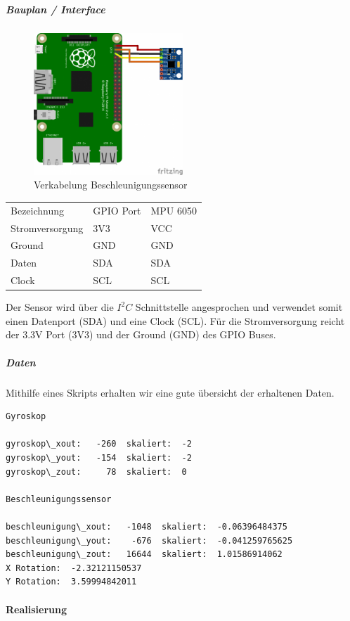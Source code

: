 \documentclass[../../main.tex]{subfiles}
\begin{document}
\subparagraph{Bauplan / Interface}
\begin{figure}[H] \centering
  \includegraphics[width=0.5\textwidth, angle=90]{Verkabelung_BeschlSensor}
  \caption{Verkabelung Beschleunigungssensor}
  \label{fig:Beschleunigungssensor}
\end{figure}

\begin{table}[] \centering
\begin{tabular}{lll}
Bezeichnung     & GPIO Port & MPU 6050 \\
Stromversorgung & 3V3      & VCC      \\
Ground          & GND      & GND      \\
Daten          & SDA      & SDA      \\
Clock          & SCL      & SCL
\end{tabular}
\end{table}

Der Sensor wird über die $I^2C$ Schnittstelle angesprochen und verwendet somit einen Datenport (SDA) und eine Clock (SCL). Für die Stromversorgung reicht der 3.3V Port (3V3) und der Ground (GND) des GPIO Buses.

\subparagraph{Daten}
Mithilfe eines Skripts erhalten wir eine gute übersicht der erhaltenen Daten.

\begin{lstlisting}
Gyroskop

gyroskop\_xout:   -260  skaliert:  -2
gyroskop\_yout:   -154  skaliert:  -2
gyroskop\_zout:     78  skaliert:  0

Beschleunigungssensor

beschleunigung\_xout:   -1048  skaliert:  -0.06396484375
beschleunigung\_yout:    -676  skaliert:  -0.041259765625
beschleunigung\_zout:   16644  skaliert:  1.01586914062
X Rotation:  -2.32121150537
Y Rotation:  3.59994842011
\end{lstlisting}

\paragraph{Realisierung}
\end{document}
